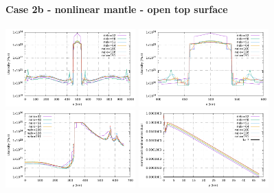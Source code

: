 \newpage
\paragraph{Case 2b - nonlinear mantle - open top surface} 

\begin{center}
\includegraphics[width=5cm]{python_codes/fieldstone_26/results/case2b/horizontal.pdf}
\includegraphics[width=5cm]{python_codes/fieldstone_26/results/case2b/horizontal_zoom.pdf}\\
\includegraphics[width=5cm]{python_codes/fieldstone_26/results/case2b/vertical.pdf}
\includegraphics[width=5cm]{python_codes/fieldstone_26/results/case2b/residual.pdf}
\end{center}

